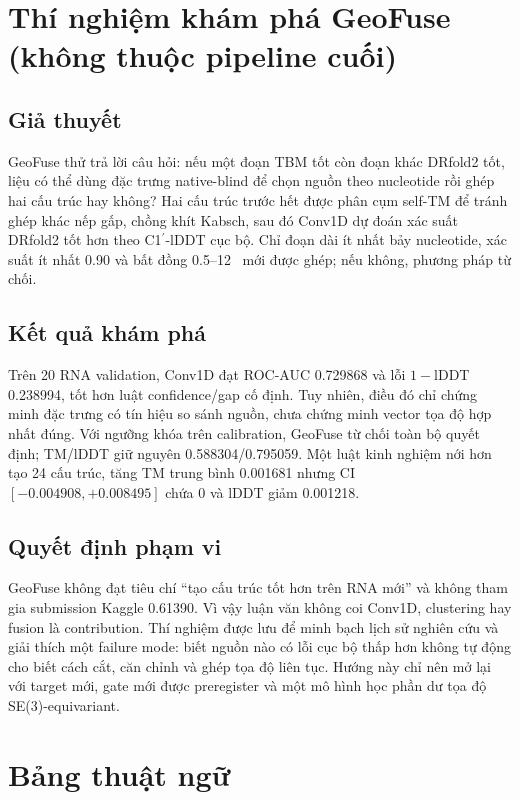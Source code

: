 \documentclass[12pt,a4paper,oneside]{report}
\newcommand{\cprime}{C1$^{\prime}$}
\newcommand{\angstrom}{\text{\AA}}
\begin{document}
\chapter{Thí nghiệm khám phá GeoFuse (không thuộc pipeline cuối)}

\section{Giả thuyết}

GeoFuse thử trả lời câu hỏi: nếu một đoạn TBM tốt còn đoạn khác DRfold2 tốt, liệu có thể
dùng đặc trưng native-blind để chọn nguồn theo nucleotide rồi ghép hai cấu trúc hay
không? Hai cấu trúc trước hết được phân cụm self-TM để tránh ghép khác nếp gấp, chồng
khít Kabsch, sau đó Conv1D dự đoán xác suất DRfold2 tốt hơn theo \cprime{}-lDDT cục bộ.
Chỉ đoạn dài ít nhất bảy nucleotide, xác suất ít nhất 0.90 và bất đồng 0.5--12~\angstrom{}
mới được ghép; nếu không, phương pháp từ chối.

\section{Kết quả khám phá}

Trên 20 RNA validation, Conv1D đạt ROC-AUC 0.729868 và lỗi $1-$lDDT 0.238994, tốt hơn
luật confidence/gap cố định. Tuy nhiên, điều đó chỉ chứng minh đặc trưng có tín hiệu so
sánh nguồn, chưa chứng minh vector tọa độ hợp nhất đúng. Với ngưỡng khóa trên
calibration, GeoFuse từ chối toàn bộ quyết định; TM/lDDT giữ nguyên 0.588304/0.795059.
Một luật kinh nghiệm nới hơn tạo 24 cấu trúc, tăng TM trung bình 0.001681 nhưng CI
$[-0.004908,+0.008495]$ chứa 0 và lDDT giảm 0.001218.

\section{Quyết định phạm vi}

GeoFuse không đạt tiêu chí ``tạo cấu trúc tốt hơn trên RNA mới'' và không tham gia
submission Kaggle 0.61390. Vì vậy luận văn không coi Conv1D, clustering hay fusion là
contribution. Thí nghiệm được lưu để minh bạch lịch sử nghiên cứu và giải thích một
failure mode: biết nguồn nào có lỗi cục bộ thấp hơn không tự động cho biết cách cắt,
căn chỉnh và ghép tọa độ liên tục. Hướng này chỉ nên mở lại với target mới, gate mới
được preregister và một mô hình học phần dư tọa độ SE(3)-equivariant.

\chapter{Bảng thuật ngữ}
\end{document}
